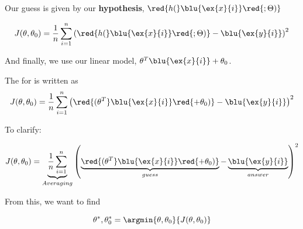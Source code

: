         Our guess is given by our \textbf{hypothesis}, $\red{h(} \blu{\ex{x}{i}} \red{;\Theta)}$
        
        \begin{equation}
            J(\theta,\theta_0) = 
            \frac{1}{n}  \sum_{i=1}^n 
            \left( 
                \red{h(} \blu{\ex{x}{i}} \red{;\Theta)} - \blu{ \ex{y}{i}} 
            \right)^2 
        \end{equation}
        
        And finally, we use our linear model, $\theta^T \blu{\ex{x}{i}}  + \theta_0$.\\
        
        \begin{kequation}
            The   for  is written as 
            \begin{equation}
                J(\theta,\theta_0) = 
                \frac{1}{n}  \sum_{i=1}^n 
                \left( \red{ (\theta^T} \blu{\ex{x}{i}} \red{ + \theta_0) } 
                - \blu{\ex{y}{i}} \right)^2 
            \end{equation}
        \end{kequation}
        
        To clarify:
        
        \begin{equation}
            J(\theta,\theta_0) = 
                        \underbrace{
                            \frac{1}{n}  \sum_{i=1}^n 
                        }_{Averaging}
                        \left( 
                            \underbrace{
                                \red{ (\theta^T} \blu{\ex{x}{i}} \red{ + \theta_0) } 
                            }_{guess}
                            - \underbrace{
                                \blu{\ex{y}{i}}
                            }_{answer}
                        \right)^2 
        \end{equation}
        
        From this, we want to find 
        
        \begin{equation*}
            \theta^*, \theta_0^* = \argmin{\theta, \theta_0}{J(\theta,\theta_0)}
        \end{equation*}
        
